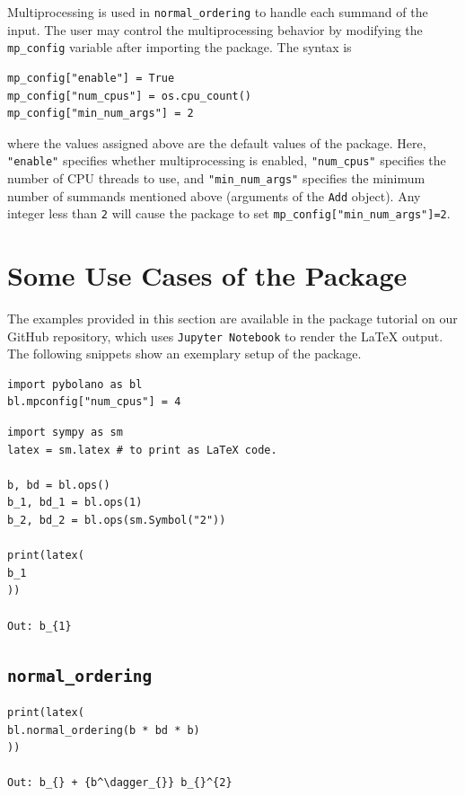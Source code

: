 \documentclass[onecolumn, 12pt, sort&compress]{elsarticle}
\newcommand{\inlinecode}[1]{\texttt{#1}}
\begin{document}
Multiprocessing is used in \inlinecode{normal_ordering} to handle each summand of the input. The user may control the multiprocessing behavior by modifying the \inlinecode{mp_config} variable after importing the package. The syntax is
\begin{verbatim}
mp_config["enable"] = True
mp_config["num_cpus"] = os.cpu_count()
mp_config["min_num_args"] = 2
\end{verbatim}
where the values assigned above are the default values of the package. Here, \inlinecode{"enable"} specifies whether multiprocessing is enabled, \inlinecode{"num_cpus"} specifies the number of CPU threads to use, and \inlinecode{"min_num_args"} specifies the minimum number of summands mentioned above (arguments of the \inlinecode{Add} object). Any integer less than \inlinecode{2} will cause the package to set \inlinecode{mp_config["min_num_args"]=2}. 


\section{Some Use Cases of the Package}\label{section:examples}

The examples provided in this section are available in the package tutorial on our GitHub repository, which uses \texttt{Jupyter Notebook} to render the \LaTeX{} output. The following snippets show an exemplary setup of the package.
\begin{verbatim}
import pybolano as bl
bl.mpconfig["num_cpus"] = 4
\end{verbatim}

\begin{verbatim}
import sympy as sm
latex = sm.latex # to print as LaTeX code.

b, bd = bl.ops()
b_1, bd_1 = bl.ops(1)
b_2, bd_2 = bl.ops(sm.Symbol("2"))

print(latex(
b_1
))

Out: b_{1}
\end{verbatim}

\subsection{\inlinecode{normal_ordering}}

\begin{verbatim}
print(latex(
bl.normal_ordering(b * bd * b)
))

Out: b_{} + {b^\dagger_{}} b_{}^{2}
\end{verbatim}
\end{document}
